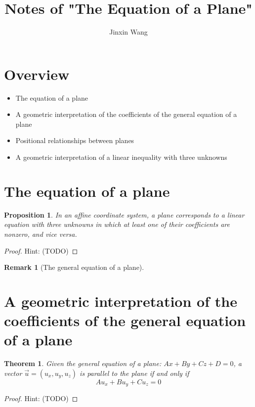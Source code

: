 \documentclass[onecolumn]{ctexart}
\title{Notes of "The Equation of a Plane"}
\author{Jinxin Wang}
\date{}
\newtheorem{theorem}{Theorem}
\newtheorem{proposition}{Proposition}
\newtheorem{remark}{Remark}
\begin{document}
\maketitle

\section{Overview}
\begin{itemize}
  \item The equation of a plane
  \item A geometric interpretation of the coefficients of the general equation of a plane
  \item Positional relationships between planes
  \item A geometric interpretation of a linear inequality with three unknowns
\end{itemize}

\section{The equation of a plane}

\begin{proposition}
  In an affine coordinate system, a plane corresponds to a linear equation with 
  three unknowns in which at least one of their coefficients are nonzero, and 
  vice versa.
\end{proposition}
\begin{proof}
  Hint: (TODO)
\end{proof}
\begin{remark}[The general equation of a plane]
  
\end{remark}

\section{A geometric interpretation of the coefficients of the general equation of a plane}
\begin{theorem}
  Given the general equation of a plane: $Ax + By + Cz + D = 0$, a vector 
  $\vec{u} = (u_x, u_y, u_z)$ is parallel to the plane if and only if
  \begin{equation}
    Au_x + Bu_y + Cu_z = 0
  \end{equation}
\end{theorem}
\begin{proof}
  Hint: (TODO)
\end{proof}
\end{document}
